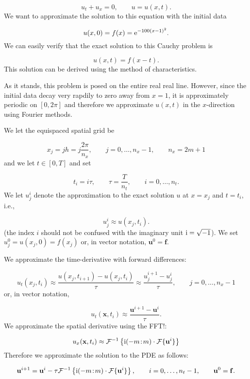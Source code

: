 \documentclass[12pt,a4paper]{article}
\begin{document}
\[
u_t + u_x = 0, \qquad u = u(x,t).
\]
We want to approximate the solution to this equation with the initial data

\[
u(x,0) = f(x) = {\rm e}^{-100(x-1)^2}.
\]
We can easily verify that the exact solution to this Cauchy problem is

\[
u(x,t) = f(x - t).
\]
This solution can be derived using the method of characteristics.     

As it stands, this problem is posed on the entire real real line.  However, since the initial data decay very rapdily to zero away from $x=1$, it is approximately periodic on $[0, 2\pi]$ and therefore we approximate $u(x,t)$ in the $x$-direction using Fourier methods. 

We let the equispaced spatial grid be

\[
x_j = jh = j \frac{2\pi}{n_x}, \qquad j = 0, \ldots, n_x-1, \qquad n_x = 2m+1
\]
and we let $t \in [0, T]$ and set

\[
t_i = i\tau, \qquad \tau = \frac{T}{n_t}, \qquad i = 0, \ldots, n_t.
\]
We let $u^{i}_j$ denote the approximation to the exact solution $u$ at $x=x_j$ and $t = t_i$, i.e.,

\[
u^{i}_j \approx u(x_j, t_i).
\]
(the index $i$ should not be confused with the imaginary unit ${\rm i} = \sqrt{-1}$).  We set $u^{0}_j = u(x_j,0) = f(x_j)$ or, in vector notation, $\mathbf{u}^{0} = \mathbf{f}$.

We approximate the time-derivative with forward differences:

\[
u_t(x_j,t_i) \approx \frac{u(x_j,t_{i+1}) - u(x_j,t_{i})}{\tau} \approx \frac{u^{i+1}_j - u^{i}_j}{\tau}, \qquad j = 0, \ldots, n_x-1
\]
or, in vector notation,

\[
u_t(\mathbf{x},t_i) \approx \frac{\mathbf{u}^{i+1} - \mathbf{u}^{i}}{\tau}.
\]
We approximate the spatial derivative using the FFT!:

\[
u_x(\mathbf{x},t_i) \approx \mathcal{F}^{-1}\left\lbrace {\rm i}(-m\!:\!m)\cdot\mathcal{F}\lbrace \mathbf{u}^{i} \rbrace\right\rbrace
\]
Therefore we approximate the solution to the PDE as follows:

\[
\mathbf{u}^{i+1} = \mathbf{u}^{i} - \tau \mathcal{F}^{-1}\left\lbrace {\rm i}(-m\!:\!m)\cdot\mathcal{F}\lbrace \mathbf{u}^{i} \rbrace\right\rbrace, \qquad i = 0, \ldots, n_t-1, \qquad \mathbf{u}^0 = \mathbf{f}.
\]
\end{document}

